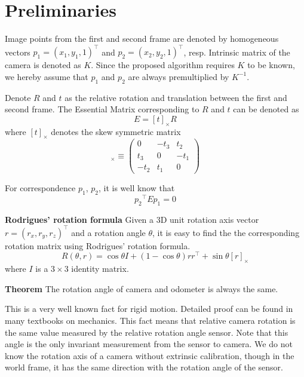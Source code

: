 \documentclass[letterpaper, 10 pt, conference]{ieeeconf}
\begin{document}
\section{Preliminaries}
\label{Preliminaries}

Image points from the first and second frame are denoted by homogeneous vectors $p_1 = (x_1, y_1, 1)^\top$ and $p_2 = (x_2, y_2, 1)^\top$, resp. Intrinsic matrix of the camera is denoted as $K$. Since the proposed algorithm requires $K$ to be known, we hereby assume that $p_1$ and $p_2$ are always premultiplied by $K^{-1}$. 

Denote $R$ and $t$ as the relative rotation and translation between the first and second frame. The Essential Matrix corresponding to $R$ and $t$ can be denoted as 
\begin{equation}
\label{EssentialDecomposition}
E = [t]_\times R
\end{equation}
where $[t]_\times$ denotes the skew symmetric matrix
\begin{equation}
[t]_\times \equiv \left(
	\begin{array}{clr}
		0 & -t_3 & t_2 \\
		t_3 & 0 & -t_1 \\
		-t_2 & t_1 & 0
	\end{array}
\right)	
\end{equation}

For correspondence $p_1$, $p_2$, it is well know that
\begin{equation}
\label{EpipolarConstraints}
{p_2}^\top E p_1 = 0
\end{equation}

\textbf{Rodrigues' rotation formula} 
Given a 3D unit rotation axis vector $r = (r_x, r_y, r_z)^\top$ and a rotation angle $\theta$, it is easy to find the the corresponding rotation matrix using Rodrigues' rotation formula. 
\begin{equation}
\label{Rodrigues}
R(\theta, r) = \cos \theta I + (1 - \cos \theta) r r^\top + \sin \theta [ r ]_\times
\end{equation}
where $I$ is a $3 \times 3$ identity matrix. 

\textbf{Theorem}
The rotation angle of camera and odometer is always the same. 

This is a very well known fact for rigid motion. Detailed proof can be found in many textbooks on mechanics. This fact means that relative camera rotation is the same value measured by the relative rotation angle sensor. Note that this angle is the only invariant measurement from the sensor to camera. We do not know the rotation axis of a camera without extrinsic calibration, though in the world frame, it has the same direction with the rotation angle of the sensor. 
\end{document}
